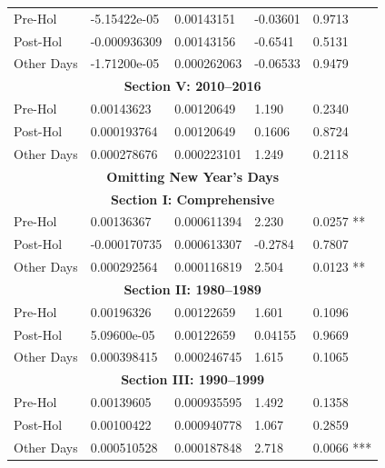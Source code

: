 \documentclass[11pt, english]{article}
\begin{document}
\begin{center}
\begin{longtable}{p{2cm}p{2cm}p{2cm}p{2cm}p{2cm}}
                Pre-Hol & -5.15422e-05 & 0.00143151 & -0.03601 & 0.9713\\
                Post-Hol & -0.000936309 & 0.00143156 & -0.6541 & 0.5131\\  
                Other Days & -1.71200e-05 & 0.000262063 & -0.06533 & 0.9479\\
                \hline 
                \multicolumn{5}{c}{\textbf{Section V: 2010--2016}}\\   
                \hline            
                Pre-Hol & 0.00143623 & 0.00120649 & 1.190 & 0.2340\\ 
                Post-Hol & 0.000193764 & 0.00120649 & 0.1606 & 0.8724\\  
                Other Days & 0.000278676 & 0.000223101 & 1.249 & 0.2118\\
                \hline 
                \hline                                          
                \multicolumn{5}{c}{\textbf{Omitting New Year's Days}}\\
		\hline
                \hline
                \multicolumn{5}{c}{\textbf{Section I: Comprehensive}}\\
                \hline
                Pre-Hol & 0.00136367 & 0.000611394 & 2.230 & 0.0257 **\\
                Post-Hol & -0.000170735 & 0.000613307 & -0.2784 & 0.7807\\
                Other Days & 0.000292564 & 0.000116819 & 2.504 & 0.0123 **\\
                \hline
                \multicolumn{5}{c}{\textbf{Section II: 1980--1989}}\\
                \hline
                Pre-Hol & 0.00196326 & 0.00122659 & 1.601 & 0.1096\\
                Post-Hol & 5.09600e-05 & 0.00122659 & 0.04155 & 0.9669\\  
                Other Days & 0.000398415 & 0.000246745 & 1.615 & 0.1065\\
                \hline 
                \multicolumn{5}{c}{\textbf{Section III: 1990--1999}}\\   
                \hline            
                Pre-Hol & 0.00139605 & 0.000935595 & 1.492 & 0.1358\\ 
                Post-Hol & 0.00100422 & 0.000940778 & 1.067 & 0.2859\\  
                Other Days & 0.000510528 & 0.000187848 & 2.718 & 0.0066 ***\\
                \hline 

\end{longtable}
\end{center}
\end{document}
